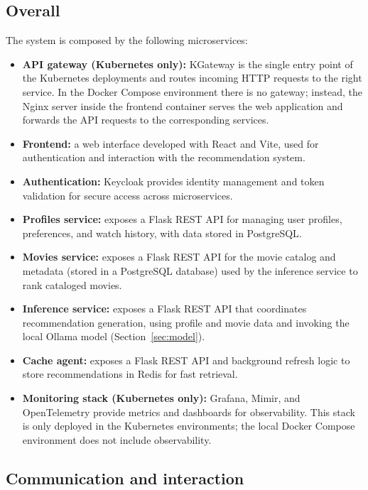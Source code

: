 \documentclass[10pt]{llncs}
\begin{document}
\subsection{Overall}

The system is composed by the following microservices:

\begin{itemize}
    \item \textbf{API gateway (Kubernetes only):} KGateway is the single entry point of the Kubernetes deployments and routes incoming HTTP requests to the right service. In the Docker Compose environment there is no gateway; instead, the Nginx server inside the frontend container serves the web application and forwards the API requests to the corresponding services.
    \item \textbf{Frontend:} a web interface developed with React and Vite, used for authentication and interaction with the recommendation system.
    \item \textbf{Authentication:} Keycloak provides identity management and token validation for secure access across microservices.
    \item \textbf{Profiles service:} exposes a Flask REST API for managing user profiles, preferences, and watch history, with data stored in PostgreSQL.
    \item \textbf{Movies service:} exposes a Flask REST API for the movie catalog and metadata (stored in a PostgreSQL database) used by the inference service to rank cataloged movies.
    \item \textbf{Inference service:} exposes a Flask REST API that coordinates recommendation generation, using profile and movie data and invoking the local Ollama model (Section~\ref{sec:model}).
    \item \textbf{Cache agent:} exposes a Flask REST API and background refresh logic to store recommendations in Redis for fast retrieval.
    \item \textbf{Monitoring stack (Kubernetes only):} Grafana, Mimir, and OpenTelemetry provide metrics and dashboards for observability. This stack is only deployed in the Kubernetes environments; the local Docker Compose environment does not include observability.
\end{itemize}

\subsection{Communication and interaction}
\end{document}
